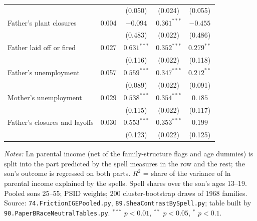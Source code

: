 \begin{table}[!htbp]
{{\begin{tabular}{lcccc}
 &  & (0.050) & (0.024) & (0.055) \\
Father's plant closures & 0.004 & $-0.094$ & $0.361^{***}$ & $-0.455$ \\
 &  & (0.483) & (0.022) & (0.486) \\
Father laid off or fired & 0.027 & $0.631^{***}$ & $0.352^{***}$ & $0.279^{**}$ \\
 &  & (0.116) & (0.022) & (0.118) \\
Father's unemployment & 0.057 & $0.559^{***}$ & $0.347^{***}$ & $0.212^{**}$ \\
 &  & (0.089) & (0.022) & (0.091) \\
Mother's unemployment & 0.029 & $0.538^{***}$ & $0.354^{***}$ & $0.185$ \\
 &  & (0.115) & (0.022) & (0.117) \\
Father's closures and layoffs & 0.030 & $0.553^{***}$ & $0.353^{***}$ & $0.199$ \\
 &  & (0.123) & (0.022) & (0.125) \\
\bottomrule
\end{tabular}}}
\par\smallskip
\begin{minipage}{\textwidth}\footnotesize \textit{Notes:} Ln parental income (net of the family-structure flags and age dummies) is split into the part predicted by the spell measures in the row and the rest; the son's outcome is regressed on both parts. $R^2$ = share of the variance of ln parental income explained by the spells. Spell shares over the son's ages 13--19. Pooled sons 25--55; PSID weights; 200 cluster-bootstrap draws of 1968 families. Source: \texttt{74.FrictionIGEPooled.py}, \texttt{89.SheaContrastBySpell.py}; table built by \texttt{90.PaperBRaceNeutralTables.py}. $^{***}$ $p<0.01$, $^{**}$ $p<0.05$, $^{*}$ $p<0.1$.\end{minipage}
\end{table}
